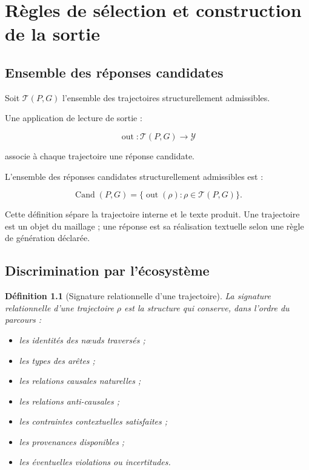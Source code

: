 \documentclass[11pt,a4paper,oneside]{book}
\newtheorem{definition}{Définition}[chapter]
\theoremstyle{remark}
\DeclareMathOperator{\Cand}{Cand}
\begin{document}
\chapter{Règles de sélection et construction de la sortie}

\section{Ensemble des réponses candidates}

Soit \(\mathcal{T}(P,G)\) l'ensemble des trajectoires structurellement
admissibles.

Une application de lecture de sortie :

\[
\operatorname{out}:\mathcal{T}(P,G)\to\mathcal{Y}
\]

associe à chaque trajectoire une réponse candidate.

L'ensemble des réponses candidates structurellement admissibles est :

\[
\Cand(P,G)
=
\{
\operatorname{out}(\rho):
\rho\in\mathcal{T}(P,G)
\}.
\]

Cette définition sépare la trajectoire interne et le texte produit.
Une trajectoire est un objet du maillage ; une réponse est sa
réalisation textuelle selon une règle de génération déclarée.

\section{Discrimination par l'écosystème}

\begin{definition}[Signature relationnelle d'une trajectoire]
La signature relationnelle d'une trajectoire \(\rho\) est la structure
qui conserve, dans l'ordre du parcours :

\begin{itemize}
  \item les identités des nœuds traversés ;
  \item les types des arêtes ;
  \item les relations causales naturelles ;
  \item les relations anti-causales ;
  \item les contraintes contextuelles satisfaites ;
  \item les provenances disponibles ;
  \item les éventuelles violations ou incertitudes.
\end{itemize}
\end{definition}
\end{document}

